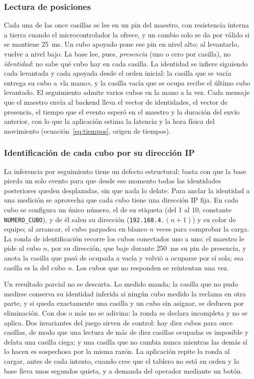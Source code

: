 \documentclass{book}
\begin{document}
\subsubsection{Lectura de posiciones}

Cada una de las once casillas se lee en un pin del maestro, con resistencia interna a tierra cuando el microcontrolador la ofrece, y un cambio solo se da por válido si se mantiene 25~ms. Un cubo apoyado pone ese pin en nivel alto; al levantarlo, vuelve a nivel bajo. La base lee, pues, \emph{presencia} (uno o cero por casilla), no \emph{identidad}: no sabe qué cubo hay en cada casilla. La identidad se infiere siguiendo cada levantada y cada apoyada desde el orden inicial: la casilla que se vacía entrega su cubo a «la mano», y la casilla vacía que se ocupa recibe el último cubo levantado. El seguimiento admite varios cubos en la mano a la vez. Cada mensaje que el maestro envía al backend lleva el vector de identidades, el vector de presencia, el tiempo que el evento esperó en el maestro y la duración del envío anterior, con lo que la aplicación estima la latencia y la hora física del movimiento (ecuación~\eqref{eq:tiempos}, origen de tiempos).

\subsubsection{Identificación de cada cubo por su dirección IP}
\label{sec:identificacion-ip}

La inferencia por seguimiento tiene un defecto estructural: basta con que la base pierda un solo evento para que desde ese momento todas las identidades posteriores queden desplazadas, sin que nada lo delate. Para anclar la identidad a una medición se aprovecha que cada cubo tiene una dirección IP fija. En cada cubo se configura un único número, el de su etiqueta (del 1 al 10, constante \texttt{NUMERO\_CUBO}), y de él salen su dirección (\texttt{192.168.4.}$(n+1)$) y su color de equipo; al arrancar, el cubo parpadea en blanco $n$ veces para comprobar la carga. La ronda de identificación recorre los cubos conectados uno a uno: el maestro le pide al cubo $n$, por su dirección, que baje durante 250~ms su pin de presencia, y anota la casilla que pasó de ocupada a vacía y volvió a ocuparse por sí sola; esa casilla es la del cubo $n$. Los cubos que no responden se reintentan una vez.

Un resultado parcial no se descarta. Lo medido manda; la casilla que no pudo medirse conserva su identidad inferida si ningún cubo medido la reclama en otra parte, y si queda exactamente una casilla y un cubo sin asignar, se deducen por eliminación. Con dos o más no se adivina: la ronda se declara incompleta y no se aplica. Dos invariantes del juego sirven de control: hay diez cubos para once casillas, de modo que una lectura de más de diez casillas ocupadas es imposible y delata una casilla ciega; y una casilla que no cambia nunca mientras las demás sí lo hacen es sospechosa por la misma razón. La aplicación repite la ronda al cargar, antes de cada intento, cuando cree que el tablero no está en orden y la base lleva unos segundos quieta, y a demanda del operador mediante un botón.
\end{document}
